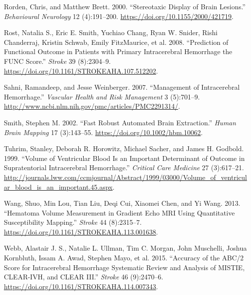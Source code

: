 \documentclass[]{elsarticle} %
\begin{document}
\leavevmode\hypertarget{ref-rorden_stereotaxic_2000}{}%
Rorden, Chris, and Matthew Brett. 2000. ``Stereotaxic Display of Brain
Lesions.'' \emph{Behavioural Neurology} 12 (4):191--200.
\url{https://doi.org/10.1155/2000/421719}.

\leavevmode\hypertarget{ref-rost_prediction_2008}{}%
Rost, Natalia S., Eric E. Smith, Yuchiao Chang, Ryan W. Snider, Rishi
Chanderraj, Kristin Schwab, Emily FitzMaurice, et al. 2008. ``Prediction
of Functional Outcome in Patients with Primary Intracerebral Hemorrhage
the FUNC Score.'' \emph{Stroke} 39 (8):2304--9.
\url{https://doi.org/10.1161/STROKEAHA.107.512202}.

\leavevmode\hypertarget{ref-sahni_management_2007}{}%
Sahni, Ramandeep, and Jesse Weinberger. 2007. ``Management of
Intracerebral Hemorrhage.'' \emph{Vascular Health and Risk Management} 3
(5):701--9. \url{http://www.ncbi.nlm.nih.gov/pmc/articles/PMC2291314/}.

\leavevmode\hypertarget{ref-smith_fast_2002}{}%
Smith, Stephen M. 2002. ``Fast Robust Automated Brain Extraction.''
\emph{Human Brain Mapping} 17 (3):143--55.
\url{https://doi.org/10.1002/hbm.10062}.

\leavevmode\hypertarget{ref-tuhrim_volume_1999}{}%
Tuhrim, Stanley, Deborah R. Horowitz, Michael Sacher, and James H.
Godbold. 1999. ``Volume of Ventricular Blood Is an Important Determinant
of Outcome in Supratentorial Intracerebral Hemorrhage.'' \emph{Critical
Care Medicine} 27 (3):617--21.
\url{http://journals.lww.com/ccmjournal/Abstract/1999/03000/Volume_of_ventricular_blood_is_an_important.45.aspx}.

\leavevmode\hypertarget{ref-wang_hematoma_2013}{}%
Wang, Shuo, Min Lou, Tian Liu, Deqi Cui, Xiaomei Chen, and Yi Wang.
2013. ``Hematoma Volume Measurement in Gradient Echo MRI Using
Quantitative Susceptibility Mapping.'' \emph{Stroke} 44 (8):2315--7.
\url{https://doi.org/10.1161/STROKEAHA.113.001638}.

\leavevmode\hypertarget{ref-webb_accuracy_2015}{}%
Webb, Alastair J. S., Natalie L. Ullman, Tim C. Morgan, John Muschelli,
Joshua Kornbluth, Issam A. Awad, Stephen Mayo, et al. 2015. ``Accuracy
of the ABC/2 Score for Intracerebral Hemorrhage Systematic Review and
Analysis of MISTIE, CLEAR-IVH, and CLEAR III.'' \emph{Stroke} 46
(9):2470--6. \url{https://doi.org/10.1161/STROKEAHA.114.007343}.
\end{document}
